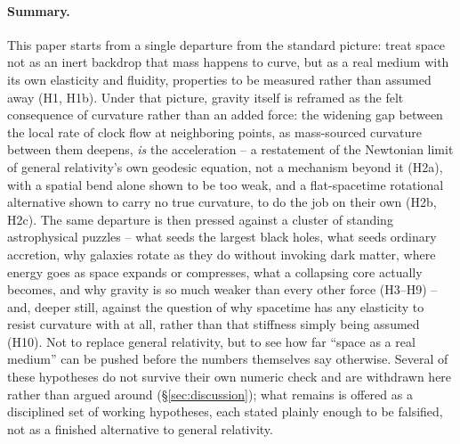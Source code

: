 \documentclass[12pt, a4paper]{article}
\begin{document}
\paragraph{Summary.}
This paper starts from a single departure from the standard picture:
treat space not as an inert backdrop that mass happens to curve, but
as a real medium with its own elasticity and fluidity, properties
to be measured rather than assumed away (H1, H1b). Under that
picture, gravity itself is reframed as the felt consequence of
curvature rather than an added force: the widening gap between the
local rate of clock flow at neighboring points, as mass-sourced
curvature between them deepens, \emph{is} the acceleration -- a
restatement of the Newtonian limit of general relativity's own
geodesic equation, not a mechanism beyond it (H2a), with a spatial
bend alone shown to be too weak, and a flat-spacetime rotational
alternative shown to carry no true curvature, to do the job on their
own (H2b, H2c). The same departure is then pressed against a cluster
of standing astrophysical puzzles -- what seeds the largest black
holes, what seeds ordinary accretion, why galaxies rotate as they do
without invoking dark matter, where energy goes as space expands or
compresses, what a collapsing core actually becomes, and why gravity
is so much weaker than every other force (H3--H9) -- and, deeper
still, against the question of why spacetime has any elasticity to
resist curvature with at all, rather than that stiffness simply being
assumed (H10). Not to replace general relativity, but to see how far
``space as a real medium'' can be pushed before the numbers
themselves say otherwise. Several of these hypotheses do not survive
their own numeric check and are withdrawn here rather than argued
around (\S\ref{sec:discussion}); what remains is offered as a
disciplined set of working hypotheses,
each stated plainly enough to be falsified, not as a finished
alternative to general relativity.
\end{document}
